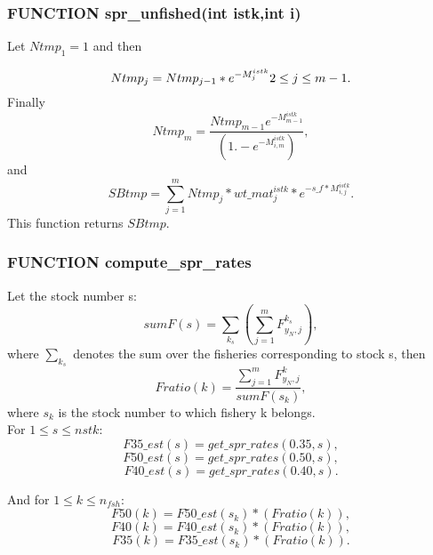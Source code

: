 \documentclass{article}
\begin{document}
\subsubsection{FUNCTION spr\_unfished(int istk,int i)}
Let $Ntmp_1=1$ and then 

\begin{equation*}
    Ntmp_j=Ntmp_{j-1}*e^{-M^{istk}_j} \\ 2 \leq j \leq m-1.
\end{equation*}
Finally
\begin{equation}
    Ntmp_m=\dfrac{Ntmp_{m-1}e^{-M^{istk}_{m-1}}}{(1.-e^{-M^{istk}_{i,m}})},
\end{equation}
and
\begin{equation}
    SBtmp=\sum_{j=1}^{m}Ntmp_j*wt\_mat_j^{istk}*e^{-s\_f * M^{istk}_{i,j}}.
\end{equation}
This function returns $SBtmp$.

\subsubsection{FUNCTION compute\_spr\_rates}

Let the stock number s:
\begin{equation}
    sumF(s)=\sum_{k_s}\left(\sum_{j=1}^mF^{k_s}_{y_N, j}\right),
\end{equation}
where $\sum_{k_s}$ denotes the sum over the fisheries corresponding to stock s, then
\begin{equation}
    Fratio(k)=\dfrac{\sum_{j=1}^mF^k_{y_N,j}}{sumF(s_k)},
\end{equation}
where $s_k$ is the stock number to which fishery k belongs.\\

For $1\leq s \leq nstk$:
 \begin{equation}
        F35\_est(s) = get\_spr\_rates(0.35,s),
    \end{equation}
     \begin{equation}
        F50\_est(s) = get\_spr\_rates(0.50,s),
    \end{equation}
     \begin{equation}
        F40\_est(s) = get\_spr\_rates(0.40,s).
    \end{equation}

And for $1\leq k \leq n_{fsh}$:
\begin{equation}
        F50(k) = F50\_est(s_k) * (Fratio(k)),
    \end{equation}
\begin{equation}
        F40(k) = F40\_est(s_k) * (Fratio(k)),
    \end{equation}
\begin{equation}
        F35(k) = F35\_est(s_k) * (Fratio(k)).
    \end{equation}
\end{document}
